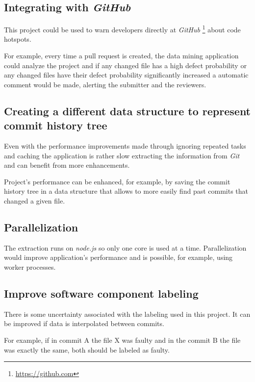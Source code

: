 \subsection{Integrating with \emph{GitHub}}

This project could be used to warn developers directly at \emph{GitHub} \footnote{\url{https://github.com}} about code hotspots.

For example, every time a pull request is created, the data mining application could analyze the project and if any changed file has a high defect probability or any changed files have their defect probability significantly increased a automatic comment would be made, alerting the submitter and the reviewers.

\subsection{Creating a different data structure to represent commit history tree}

Even with the performance improvements made through ignoring repeated tasks and caching the application is rather slow extracting the information from \emph{Git} and can benefit from more enhancements.

Project's performance can be enhanced, for example, by saving the commit history tree in a data structure that allows to more easily find past commits that changed a given file.

\subsection{Parallelization}

The extraction runs on \emph{node.js} so only one core is used at a time. Parallelization would improve application's performance and is possible, for example, using worker processes.

\subsection{Improve software component labeling}

There is some uncertainty associated with the labeling used in this project. It can be improved if data is interpolated between commits. 

For example, if in commit A the file X was faulty and in the commit B the file was exactly the same, both should be labeled as faulty.